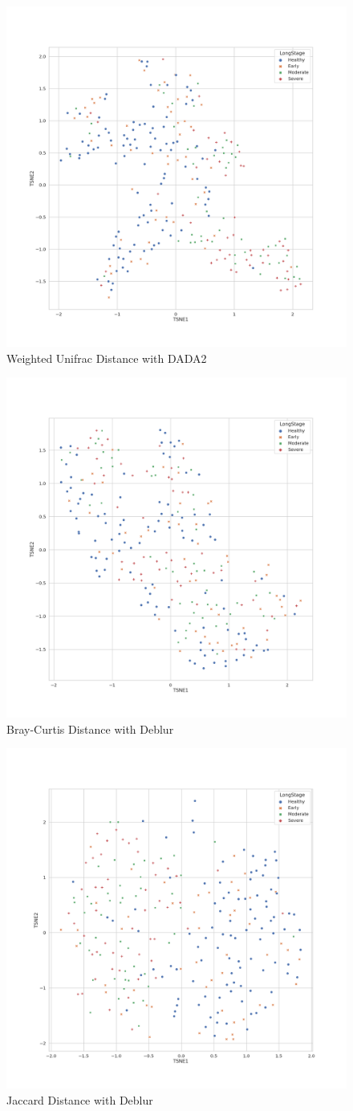 \documentclass{beamer}
\begin{document}
\begin{frame}[allowframebreaks]
        \begin{figure}
            \includegraphics[width=0.5 \linewidth]{figures/BetaDiversity/DADA2.weighted_unifrac.png}
            \caption{Weighted Unifrac Distance with DADA2}
        \end{figure}

        \begin{figure}
            \includegraphics[width=0.5 \linewidth]{figures/BetaDiversity/Deblur.bray_curtis.png}
            \caption{Bray-Curtis Distance with Deblur}
        \end{figure}

        \begin{figure}
            \includegraphics[width=0.5 \linewidth]{figures/BetaDiversity/Deblur.jaccard.png}
            \caption{Jaccard Distance with Deblur}
        \end{figure}


\end{frame}
\end{document}
